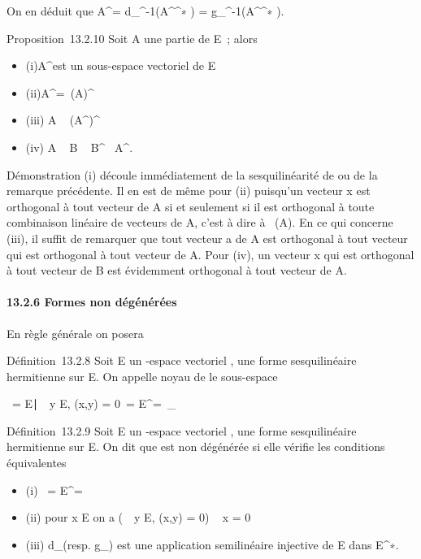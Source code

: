 \documentclass[]{article}
\begin{document}
On en déduit que A^\bot =
d_\phi^-1(A^\bot^∗ ) =
g_\phi^-1(A^\bot^∗ ).

Proposition~13.2.10 Soit A une partie de E~; alors

\begin{itemize}
\itemsep1pt\parskip0pt
\item
  (i)A^\bot est un sous-espace vectoriel de E
\item
  (ii)A^\bot =\
  \mathrmVect(A)^\bot
\item
  (iii) A \subset~ (A^\bot)^\bot
\item
  (iv) A \subset~ B \rigtharrow~ B^\bot\subset~ A^\bot.
\end{itemize}

Démonstration (i) découle immédiatement de la sesquilinéarité de \phi ou de
la remarque précédente. Il en est de même pour (ii) puisqu'un vecteur x
est orthogonal à tout vecteur de A si et seulement si il est orthogonal
à toute combinaison linéaire de vecteurs de A, c'est à dire à
\mathrmVect~(A). En ce qui
concerne (iii), il suffit de remarquer que tout vecteur a de A est
orthogonal à tout vecteur qui est orthogonal à tout vecteur de A. Pour
(iv), un vecteur x qui est orthogonal à tout vecteur de B est évidemment
orthogonal à tout vecteur de A.

\paragraph{13.2.6 Formes non dégénérées}

En règle générale on posera

Définition~13.2.8 Soit E un -espace vectoriel , \phi une forme
sesquilinéaire hermitienne sur E. On appelle noyau de \phi le sous-espace

\mathrmKer~\phi =
\x \in
E∣\forall~~y \in E, \phi(x,y) =
0\ = E^\bot =\
\mathrmKerd_ \phi

Définition~13.2.9 Soit E un -espace vectoriel , \phi une forme
sesquilinéaire hermitienne sur E. On dit que \phi est non dégénérée si elle
vérifie les conditions équivalentes

\begin{itemize}
\itemsep1pt\parskip0pt
\item
  (i) \mathrmKer~\phi =
  E^\bot = \0\
\item
  (ii) pour x \in E on a \left
  (\forall~~y \in E, \phi(x,y) = 0\right ) \rigtharrow~
  x = 0
\item
  (iii) d_\phi (resp. g_\phi) est une application
  semilinéaire injective de E dans E^∗.
\end{itemize}
\end{document}
